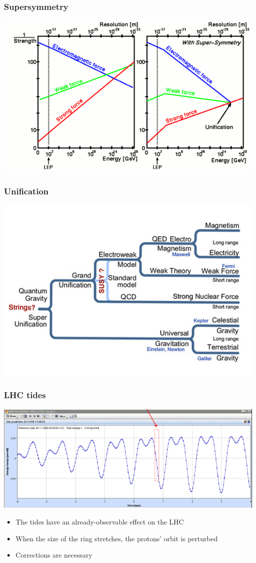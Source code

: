 \documentclass[compress]{beamer}
\begin{document}
\begin{frame}
\frametitle{Supersymmetry}
\includegraphics[width=\linewidth]{supersymmetry_unification.png}
\end{frame}

\begin{frame}
\frametitle{Unification}
\includegraphics[width=\linewidth]{super_unification.jpg}
\end{frame}

\begin{frame}
\frametitle{LHC tides}
\includegraphics[width=\linewidth]{lhc_tides.png}

\begin{itemize}
\item The tides have an already-observable effect on the LHC
\item When the size of the ring stretches, the protons' orbit is perturbed
\item Corrections are necessary
\end{itemize}
\end{frame}
\end{document}
